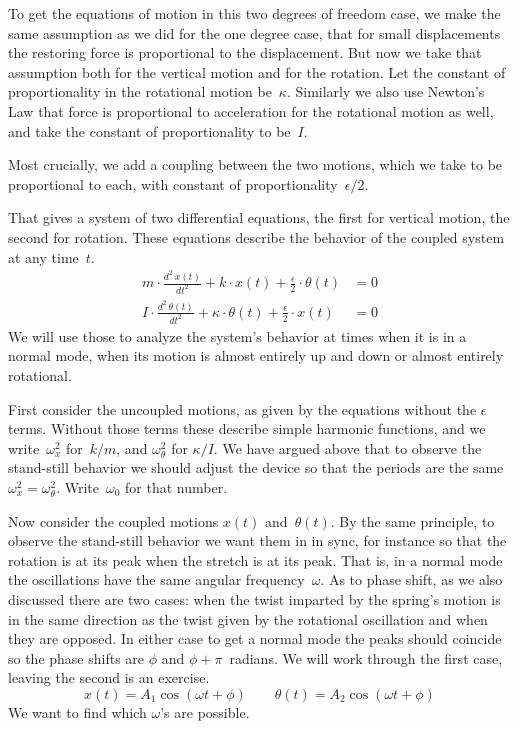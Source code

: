 To get the equations of motion in this two degrees of freedom case,
we make the same assumption as we did for the one degree case,
that for small displacements the restoring force is
proportional to the displacement. 
But now we take that assumption both for
the vertical motion and for the rotation.
Let the constant of proportionality in the rotational motion be~$\kappa$.
Similarly we also use Newton's Law that force is proportional to 
acceleration for the rotational motion as well, and take
the constant of proportionality to be~$I$. 

Most crucially, we add a coupling between the two
motions, which we take to be proportional to each, with constant of 
proportionality~$\epsilon/2$.

That gives a system of two differential equations,
the first for vertical motion, the second
for rotation.
These equations describe the behavior of the coupled system at any time~$t$.
\begin{equation*}
  \begin{split}
  m\cdot\frac{d^2\,x(t)}{dt^2}
      +k\cdot x(t)+\frac{\epsilon}{2}\cdot \theta(t) 
      &=0  \\
  I\cdot\frac{d^2\,\theta(t)}{dt^2}
      +\kappa\cdot \theta(t)+\frac{\epsilon}{2}\cdot x(t)  
      &=0
  \end{split}
  \tag{$**$}
\end{equation*}
We will use those to analyze the
system's behavior at times when it is in a normal mode, when
its motion is almost entirely up and down 
or almost entirely rotational.

First consider the uncoupled motions, as given by the equations without the
$\epsilon$ terms.
Without those terms these describe simple harmonic functions,
and we write~$\omega_x^2$ for~$k/m$, and $\omega_\theta^2$ for $\kappa/I$.
We have argued above that to observe the stand-still behavior we should 
adjust the device so that the periods are the same $\omega_x^2=\omega_\theta^2$. 
Write~$\omega_0$ for that number.

Now consider the coupled motions $x(t)$ and~$\theta(t)$.
By the same principle, to observe the stand-still behavior we want them in 
in sync, for instance so that the rotation is at its
peak when the stretch is at its peak.
That is, in a normal mode the oscillations have the same
angular frequency~$\omega$.
As to phase shift, as we also discussed there are two
cases: when the twist imparted by the spring's motion is in the same direction
as the twist given by the rotational oscillation and when they are opposed.
In either case to get a normal mode the peaks should coincide so the
phase shifts are $\phi$ and $\phi+\pi$~radians.
We will work through the first case, leaving the second is an exercise.
\begin{equation*}
  x(t) = A_1\cos(\omega t+\phi)  
  \qquad
  \theta(t) = A_2\cos(\omega t+\phi)  
\end{equation*}
We want to find which $\omega$'s are possible.

